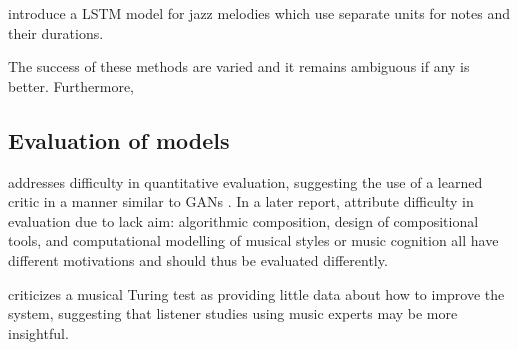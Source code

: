 \documentclass[dissertation.tex]{subfile}
\begin{document}
\cite{franklin2005jazz} introduce a LSTM model for jazz melodies which use
separate units for notes and their durations.

The success of these methods are varied and it remains ambiguous if any
is better. Furthermore,

\subsection{Evaluation of models}

\cite{pearce2001towards} addresses difficulty in quantitative evaluation,
suggesting the use of a learned critic in a manner similar to GANs
\cite{goodfellow2014generative}. In a later report,
\cite{pearce2002motivations} attribute difficulty in evaluation due to lack
aim: algorithmic composition, design of compositional tools, and computational
modelling of musical styles or music cognition all have different motivations
and should thus be evaluated differently.

\cite{ariza2009} criticizes a musical Turing test as providing little data about
how to improve the system, suggesting that listener studies using music experts
may be more insightful.




\printbibliography
\end{document}
